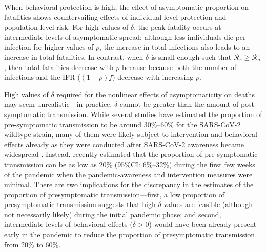 \documentclass[12pt]{article}
\newcommand{\RR}{\ensuremath{{\mathcal R}}\xspace}
\begin{document}
When behavioral protection is high, the effect of asymptomatic proportion on fatalities shows countervailing effects of individual-level protection and population-level risk.
For high values of $\delta$, the peak fatality occurs at intermediate levels of asymptomatic spread:
although less individuals die per infection for higher values of $p$, the increase in total infections also leads to an increase in total fatalities.
In contrast, when $\delta$ is small enough such that $\RR_s\geq\RR_a$, then total fatalities decrease with $p$ because because both the number of infections and the IFR ($(1-p)f$) decrease with increasing $p$.

High values of $\delta$ required for the nonlinear effects of asymptomaticity on deaths may seem unrealistic---in practice, $\delta$ cannot be greater than the amount of post-symptomatic transmission.
While several studies have estimated the proportion of pre-symptomatic transmission to be around 30\%--60\% for the SARS-CoV-2 wildtype strain, many of them were likely subject to intervention and behavioral effects already as they were conducted after SARS-CoV-2 awareness became widespread \citep{he2020temporal}.
Instead, \cite{sender2021unmitigated} recently estimated that the proportion of pre-symptomatic transmission can be as low as 20\% (95\%CI: 6\%--32\%) during the first few weeks of the pandemic when the pandemic-awareness and intervention measures were minimal.
There are two implications for the discrepancy in the estimates of the proportion of presymptomatic transmission---first, a low proportion of presymptomatic transmission suggests that high $\delta$ values are feasible (although not necessarily likely) during the initial pandemic phase; and second, intermediate levels of behavioral effects ($\delta > 0$) would have been already present early in the pandemic to reduce the proportion of presymptomatic transmission from 20\% to 60\%.
\end{document}
